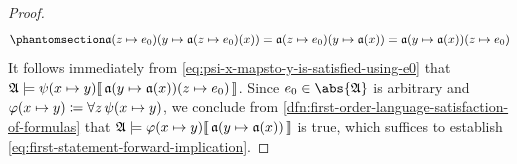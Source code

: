 \begin{proof}
\begin{equation}
        \phantomsection \label{eq:rearranging-the-order-of-modification-for-modified-a}
        \folmodifiedvariableassignmentfunction{ \folmodifiedvariableassignmentfunction{\mathfrak{a}}{z}{e_{0}} }{y}{ \folmodifiedvariableassignmentfunction{\mathfrak{a}}{z}{e_{0}}(x) } = \folmodifiedvariableassignmentfunction{ \folmodifiedvariableassignmentfunction{\mathfrak{a}}{z}{e_{0}} }{y}{ \mathfrak{a}(x) }
     = \folmodifiedvariableassignmentfunction{ \folmodifiedvariableassignmentfunction{\mathfrak{a}}{y}{\mathfrak{a}(x)} }{z}{e_{0}}
    \end{equation}
    It follows immediately from \eqref{eq:psi-x-mapsto-y-is-satisfied-using-e0} that
    \( \folwffsatisfaction{\mathfrak{A}}{ \folfreevariablereplacement{\psi}{x}{y} }{ \folmodifiedvariableassignmentfunction{ \folmodifiedvariableassignmentfunction{\mathfrak{a}}{y}{\mathfrak{a}(x)} }{z}{e_{0}} } \).
    Since \( e_{0} \in \abs{\mathfrak{A}} \) is arbitrary and \( \folfreevariablereplacement{\varphi}{x}{y} \coloneq \forall z \, \folfreevariablereplacement{\psi}{x}{y} \),
    we conclude from \cref{dfn:first-order-language-satisfaction-of-formulas} that
    \( \folwffsatisfaction{\mathfrak{A}}{ \folfreevariablereplacement{\varphi}{x}{y} }{ \folmodifiedvariableassignmentfunction{\mathfrak{a}}{y}{ \mathfrak{a}(x) } } \)
    is true, which suffices to establish \eqref{eq:first-statement-forward-implication}.


\end{proof}
